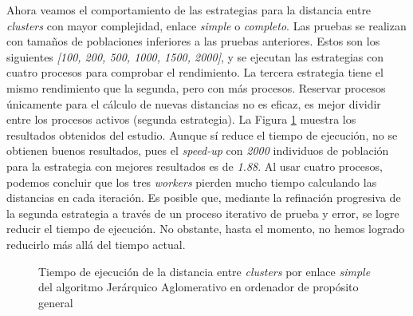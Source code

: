 Ahora veamos el comportamiento de las estrategias para la distancia entre \textit{clusters} con mayor complejidad, enlace \textit{simple} o \textit{completo}. Las pruebas se realizan con tamaños de poblaciones inferiores a las pruebas anteriores. Estos son los siguientes \textit{[100, 200, 500, 1000, 1500, 2000]}, y se ejecutan las estrategias con cuatro procesos para comprobar el rendimiento. La tercera estrategia tiene el mismo rendimiento que la segunda, pero con más procesos. Reservar procesos únicamente para el cálculo de nuevas distancias no es eficaz, es mejor dividir entre los procesos activos (segunda estrategia). La Figura \ref{fig:JA_simple} muestra los resultados obtenidos del estudio. Aunque sí reduce el tiempo de ejecución, no se obtienen buenos resultados, pues el \textit{speed-up} con \textit{2000} individuos de población para la estrategia con mejores resultados es de \textit{1.88}. Al usar cuatro procesos, podemos concluir que los tres \textit{workers} pierden mucho tiempo calculando las distancias en cada iteración. Es posible que, mediante la refinación progresiva de la segunda estrategia a través de un proceso iterativo de prueba y error, se logre reducir el tiempo de ejecución. No obstante, hasta el momento, no hemos logrado reducirlo más allá del tiempo actual.

\begin{figure}[!h]
	\hspace{-0.10\textwidth}
	\caption{Tiempo de ejecución de la distancia entre \textit{clusters} por enlace \textit{simple} del algoritmo Jerárquico Aglomerativo en ordenador de propósito general}
	\label{fig:JA_simple}
\end{figure}


